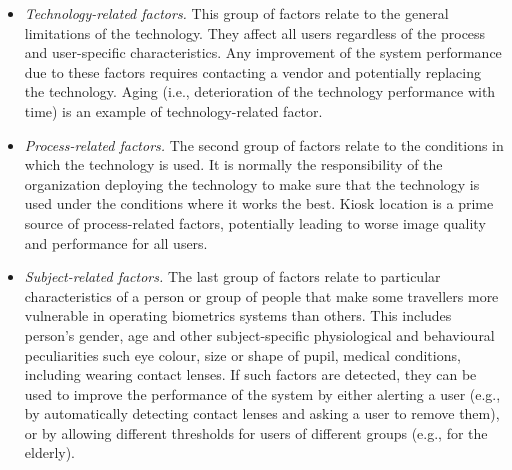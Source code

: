 \documentclass{cta-author}%
\begin{document}
\begin{itemize}
	
		\item \textit{Technology-related factors.} This group of factors relate to the general limitations of the technology. They affect all users regardless of the process and user-specific characteristics. Any improvement of the system performance due to these factors requires contacting a vendor and potentially replacing the technology. Aging 
		(i.e., deterioration of the technology performance with time) 
		is an example of technology-related factor. 

			\item \textit{Process-related factors.}  The second group of factors relate to the conditions in which the technology is used. It is normally the responsibility of the organization deploying the technology to make sure that the technology is used under the conditions where it works the best. Kiosk location is a prime source of process-related factors, potentially leading to worse image quality and performance for all users. %
			


	\item \textit{Subject-related factors.} The last group of factors relate to particular characteristics of a person or group of people that make some travellers more vulnerable in operating biometrics systems 
	than others. 
	This includes person's gender, age and  other subject-specific physiological and behavioural 	peculiarities such eye colour, size or shape of  pupil, medical conditions, including wearing contact lenses.
	If such factors are detected, they can be used to improve the performance of the system by either alerting a user (e.g.,  by automatically detecting contact lenses and asking a user to remove them), or by allowing different thresholds for users of different groups (e.g., for the elderly). 

\end{itemize}
\end{document}
